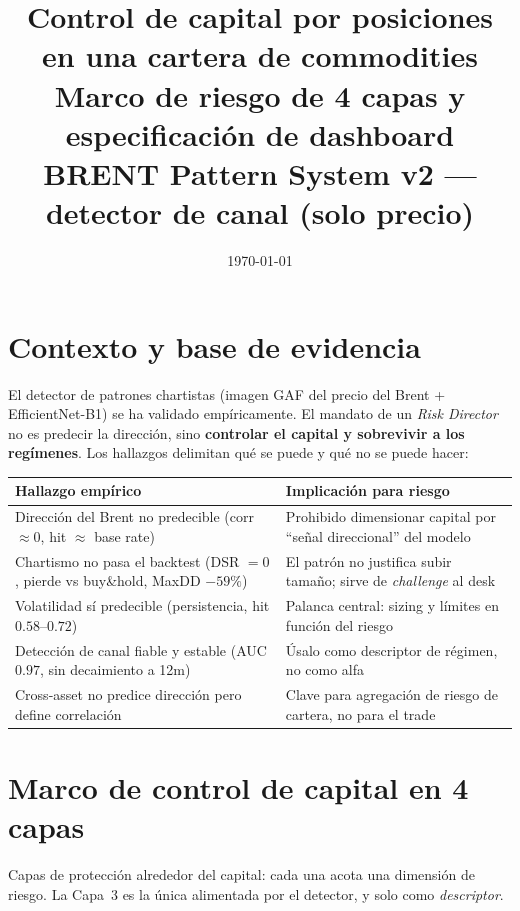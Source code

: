 \documentclass[11pt]{article}
\title{\textbf{Control de capital por posiciones en una cartera de commodities}\\[2pt]
\large Marco de riesgo de 4 capas y especificación de dashboard\\
\normalsize BRENT Pattern System v2 --- detector de canal (solo precio)}
\author{}
\date{\today}
\begin{document}
\maketitle

\section{Contexto y base de evidencia}
El detector de patrones chartistas (imagen GAF del precio del Brent + EfficientNet-B1)
se ha validado empíricamente. El mandato de un \emph{Risk Director} no es predecir la
direcci\'on, sino \textbf{controlar el capital y sobrevivir a los reg\'imenes}. Los
hallazgos delimitan qu\'e se puede y qu\'e no se puede hacer:

\begin{table}[h]
\centering\small
\begin{tabularx}{\textwidth}{L L}
\toprule
\textbf{Hallazgo emp\'irico} & \textbf{Implicaci\'on para riesgo}\\
\midrule
Direcci\'on del Brent no predecible (corr $\approx 0$, hit $\approx$ base rate) & Prohibido dimensionar capital por ``se\~nal direccional'' del modelo\\
Chartismo no pasa el backtest (DSR $=0$, pierde vs buy\&hold, MaxDD $-59\%$) & El patr\'on no justifica subir tama\~no; sirve de \emph{challenge} al desk\\
Volatilidad s\'i predecible (persistencia, hit $0.58$--$0.72$) & Palanca central: sizing y l\'imites en funci\'on del riesgo\\
Detecci\'on de canal fiable y estable (AUC $0.97$, sin decaimiento a 12m) & \'Usalo como descriptor de r\'egimen, no como alfa\\
Cross-asset no predice direcci\'on pero define correlaci\'on & Clave para agregaci\'on de riesgo de cartera, no para el trade\\
\bottomrule
\end{tabularx}
\end{table}

\section{Marco de control de capital en 4 capas}
Capas de protecci\'on alrededor del capital: cada una acota una dimensi\'on de riesgo.
La Capa~3 es la \'unica alimentada por el detector, y solo como \emph{descriptor}.
\end{document}
